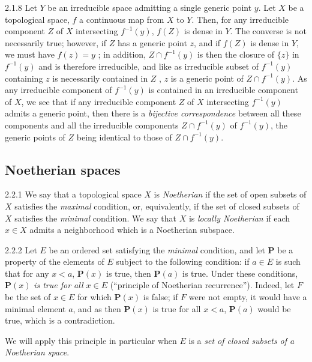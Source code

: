 \begin{env}{2.1.8}
\label{env-0.2.1.8}
Let $Y$ be an irreducible space admitting a single generic point $y$. Let $X$ be
a topological space, $f$ a continuous map from $X$ to $Y$. Then, for any
irreducible component $Z$ of $X$ intersecting $f^{-1}(y)$, $f(Z)$ is dense in
$Y$. The converse is not necessarily true; however, if $Z$ has a generic point
$z$, and if $f(Z)$ is dense in $Y$, we must have $f(z)=y$ ; in
addition, $Z\cap f^{-1}(y)$ is then the closure of $\{z\}$ in $f^{-1}(y)$ and is
therefore irreducible, and like as irreducible subset of $f^{-1}(y)$ containing
$z$ is necessarily contained in $Z$ , $z$ is a generic point of
$Z\cap f^{-1}(y)$. As any irreducible component of $f^{-1}(y)$ is contained in
an irreducible component of $X$, we see that if any irreducible component $Z$ of
$X$ intersecting $f^{-1}(y)$ admits a generic point, then there is a
\emph{bijective correspondence} between all these components and all the
irreducible components $Z\cap f^{-1}(y)$ of $f^{-1}(y)$, the generic points of
$Z$ being identical to those of $Z\cap f^{-1}(y)$.
\end{env}

\subsection{Noetherian spaces}
\label{0-prelim-2.2}

\begin{env}{2.2.1}
\label{env-0.2.2.1}
We say that a topological space $X$ is \emph{Noetherian} if the set of open
subsets of $X$ satisfies the \emph{maximal} condition, or, equivalently, if the
set of closed subsets of $X$ satisfies the \emph{minimal} condition. We say that
$X$ is \emph{locally Noetherian} if each $x\in X$ admits a neighborhood which is
a Noetherian subspace.
\end{env}

\begin{env}{2.2.2}
\label{env-0.2.2.2}
Let $E$ be an ordered set satisfying the \emph{minimal} condition, and let
$\mathbf{P}$ be a property of the elements of $E$ subject to the following
condition: if $a\in E$ is such that for any $x<a$, $\mathbf{P}(x)$ is true, then
$\mathbf{P}(a)$ is true. Under these conditions, $\mathbf{P}(x)$ \emph{is true
for all $x\in E$} (``principle of Noetherian recurrence''). Indeed, let $F$ be
the set of $x\in E$ for which $\mathbf{P}(x)$ is false; if $F$ were not empty,
it would have a minimal element $a$, and as then $\mathbf{P}(x)$ is true for all
$x<a$, $\mathbf{P}(a)$ would be true, which is a contradiction.

We will apply this principle in particular when $E$ is a \emph{set of closed
subsets of a Noetherian space}.
\end{env}

